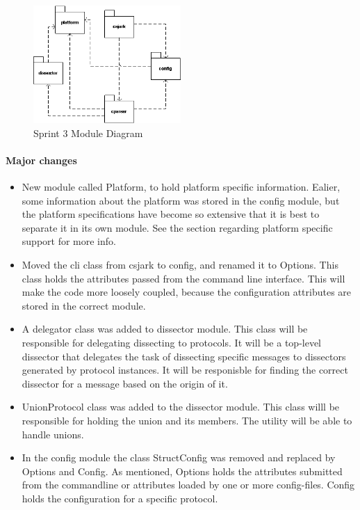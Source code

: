 \begin{figure}[htbp]
	\center
	\includegraphics[width=0.5\textwidth]{./sprints/img/sp3modulediagram}
	\caption{Sprint 3 Module Diagram\label{fig:modulesp3}}
\end{figure}

\paragraph{Major changes}
\begin{itemize}
\item New module called Platform, to hold platform specific information. Ealier, some information about the platform was stored in the config module, but the platform specifications have become so extensive that it is best to separate it in its own module. See the section regarding platform specific support for more info.
\item Moved the \gls{cli} class from csjark to config, and renamed it to Options. This class holds the attributes passed from the command line interface. This will make the code more loosely coupled, because the configuration attributes are stored in the correct module. 
\item A delegator class was added to \gls{dissector} module. This class will be responsible for delegating dissecting to \glspl{protocol}. It will be a top-level \gls{dissector} that delegates the task of dissecting specific messages to \glspl{dissector} generated by \gls{protocol} instances. It will be responisble for finding the correct \gls{dissector} for a message based on the origin of it.
\item UnionProtocol class was added to the \gls{dissector} module. This class willl be responsible for holding the \gls{union} and its \glspl{member}. The \gls{utility} will be able to handle \glspl{union}. 
\item In the config module the class StructConfig was removed and replaced by Options and Config. As mentioned, Options holds the attributes submitted from the commandline or attributes loaded by one or more config-files. Config holds the configuration for a specific \gls{protocol}.

\end{itemize}


